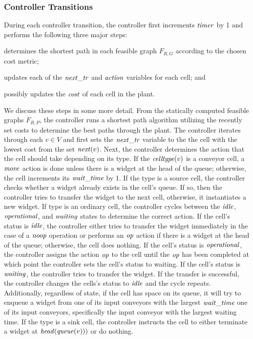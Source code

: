 \subsubsection*{Controller Transitions}
During each controller transition, the controller first increments $\mathit{timer}$ by 1 and performs the following three major steps: 
\begin{enumerate*}[label=(\roman*)]
    \item determines the shortest path in each feasible graph $F_{R,G}$ according to the chosen cost metric; 
    \item updates each of the $\mathit{next\_tr}$ and $\mathit{action}$ variables for each cell; and
     \item possibly updates the $\mathit{cost}$ of each cell in the plant.
\end{enumerate*}
We discuss these steps in some more detail.
From the statically computed feasible graphs $F_{R,P}$, the controller runs a shortest path algorithm utilizing the recently set costs to determine the best paths through the plant.
The controller iterates through each $v \in V$ and first sets the $\mathit{next\_tr}$ variable to the the cell with the lowest cost from the set ${\mathit{next}}(v)$. Next, the controller determines the action that the cell should take depending on its type. If the $\mathit{celltype}(v)$ is a conveyor cell, a $\mathit{move}$ action is done unless there is a widget at the head of the queue; otherwise, the cell increments its $\mathit{wait\_time}$ by 1. If the type is a source cell, the controller checks whether a widget already exists in the cell's queue. If so, then the controller tries to transfer the widget to the next cell, otherwise, it instantiates a new widget. If type is an ordinary cell, the controller cycles between the $\mathit{idle}$, $\mathit{operational}$, and $\mathit{waiting}$ states to determine the correct action. If the cell's status is $\mathit{idle}$, the controller either tries to transfer the widget immediately in the case of a $\mathit{noop}$ operation or performs an $\mathit{op}$ action if there is a widget at the head of the queue; otherwise, the cell does nothing. If the cell's status is $\mathit{operational}$, the controller assigns the action $\mathit{op}$ to the cell until the $\mathit{op}$ has been completed at which point the controller sets the cell's status to waiting. If the cell's status is $\mathit{waiting}$, the controller tries to transfer the widget. If the transfer is successful, the controller changes the cells's status to $\mathit{idle}$ and the cycle repeats. Additionally, regardless of state, if the cell has space on its queue, it will try to enqueue a widget from one of its input conveyors with the largest $\mathit{wait\_time}$ one of its input conveyors, specifically the input conveyor with the largest waiting time. If the type is a sink cell, the controller instructs the cell to either terminate a widget at $\mathit{head}(\mathit{queue}(v)))$ or do nothing.

\begin{figure}[!ht]
	\centering
\end{figure}